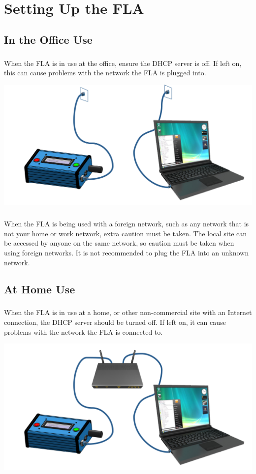 \documentclass[11pt, oneside]{book}
\begin{document}
\chapter{Setting Up the FLA}
\section{In the Office Use}\label{sec:setting_fla_in_office}
\paragraph{  }
When the FLA is in use at the office, ensure the DHCP server is off. If left on, this can cause problems with the network the FLA is plugged into.
\begin{center}
\includegraphics[width=.9\linewidth]{../media/graphics/fla_in_office}
\end{center}
\paragraph{  }
When the FLA is being used with a foreign network, such as any network that is not your home or work network, extra caution must be taken. The local site can be accessed by anyone on the same network, so caution must be taken when using foreign networks. It is not recommended to plug the FLA into an unknown network.
\section{At Home Use}\label{sec:setting_fla_at_home}
\paragraph{  }
When the FLA is in use at a home, or other non-commercial site with an Internet connection, the DHCP server should be turned off. If left on, it can cause problems with the network the FLA is connected to.
\begin{center}
\includegraphics[width=.9\linewidth]{../media/graphics/fla_at_home}
\end{center}
\end{document}
